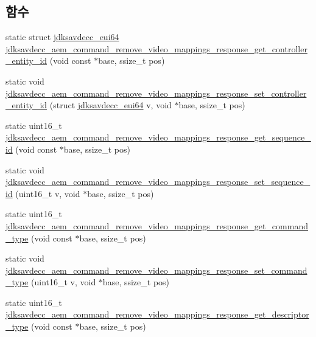 \subsection*{함수}
\begin{DoxyCompactItemize}
\item 
static struct \hyperlink{structjdksavdecc__eui64}{jdksavdecc\+\_\+eui64} \hyperlink{group__command__remove__video__mappings__response_gaabb1b2b16125f9cf5fb2da1b310e7a55}{jdksavdecc\+\_\+aem\+\_\+command\+\_\+remove\+\_\+video\+\_\+mappings\+\_\+response\+\_\+get\+\_\+controller\+\_\+entity\+\_\+id} (void const $\ast$base, ssize\+\_\+t pos)
\item 
static void \hyperlink{group__command__remove__video__mappings__response_ga91d6bfd7a65ac2b2e624c5eb786d33cb}{jdksavdecc\+\_\+aem\+\_\+command\+\_\+remove\+\_\+video\+\_\+mappings\+\_\+response\+\_\+set\+\_\+controller\+\_\+entity\+\_\+id} (struct \hyperlink{structjdksavdecc__eui64}{jdksavdecc\+\_\+eui64} v, void $\ast$base, ssize\+\_\+t pos)
\item 
static uint16\+\_\+t \hyperlink{group__command__remove__video__mappings__response_ga8c85530f0db93df2d15fb5ac29dcdf08}{jdksavdecc\+\_\+aem\+\_\+command\+\_\+remove\+\_\+video\+\_\+mappings\+\_\+response\+\_\+get\+\_\+sequence\+\_\+id} (void const $\ast$base, ssize\+\_\+t pos)
\item 
static void \hyperlink{group__command__remove__video__mappings__response_gaab91c952a5f9f7ba6a5c98b7e3a920ca}{jdksavdecc\+\_\+aem\+\_\+command\+\_\+remove\+\_\+video\+\_\+mappings\+\_\+response\+\_\+set\+\_\+sequence\+\_\+id} (uint16\+\_\+t v, void $\ast$base, ssize\+\_\+t pos)
\item 
static uint16\+\_\+t \hyperlink{group__command__remove__video__mappings__response_ga0b1795fb99900e44b13968a5a14157b3}{jdksavdecc\+\_\+aem\+\_\+command\+\_\+remove\+\_\+video\+\_\+mappings\+\_\+response\+\_\+get\+\_\+command\+\_\+type} (void const $\ast$base, ssize\+\_\+t pos)
\item 
static void \hyperlink{group__command__remove__video__mappings__response_ga6732b11726c28ea4c3e2529067bbb682}{jdksavdecc\+\_\+aem\+\_\+command\+\_\+remove\+\_\+video\+\_\+mappings\+\_\+response\+\_\+set\+\_\+command\+\_\+type} (uint16\+\_\+t v, void $\ast$base, ssize\+\_\+t pos)
\item 
static uint16\+\_\+t \hyperlink{group__command__remove__video__mappings__response_ga5fea68f5bfa4aa77172a6b98a462f557}{jdksavdecc\+\_\+aem\+\_\+command\+\_\+remove\+\_\+video\+\_\+mappings\+\_\+response\+\_\+get\+\_\+descriptor\+\_\+type} (void const $\ast$base, ssize\+\_\+t pos)

\end{DoxyCompactItemize}
